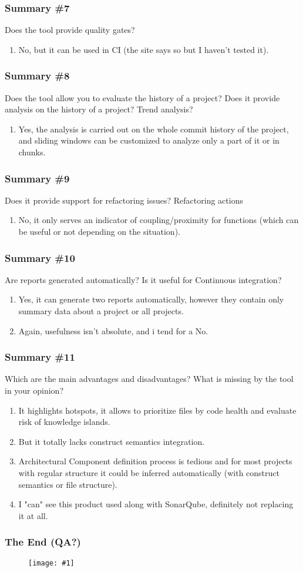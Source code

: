 \documentclass{beamer}
\newcommand{\putimage}[2] {
\begin{figure}[H]
  \centering
  \texttt{[image: \#1]}
\end{figure}
}
\begin{document}
\begin{frame}
  \frametitle{Summary \#7}
  Does the tool provide quality gates?
  \begin{enumerate}
    \item No, but it can be used in CI (the site says so but I haven't tested it).
  \end{enumerate}
\end{frame}

\begin{frame}
  \frametitle{Summary \#8}
  Does the tool allow you to evaluate the history of a project? Does it provide analysis on the history of a project? Trend analysis?
  \begin{enumerate}
    \item Yes, the analysis is carried out on the whole commit history of the project, and sliding windows can be customized to analyze only a part of it or in chunks.
  \end{enumerate}
\end{frame}

\begin{frame}
  \frametitle{Summary \#9}
  Does it provide support for refactoring issues? Refactoring actions
  \begin{enumerate}
    \item No, it only serves an indicator of coupling/proximity for functions (which can be useful or not depending on the situation).
  \end{enumerate}
\end{frame}

\begin{frame}
  \frametitle{Summary \#10}
  Are reports generated automatically? Is it useful for Continuous integration?
  \begin{enumerate}
    \item Yes, it can generate two reports automatically, however they contain only summary data about a project or all projects.
    \item Again, usefulness isn't absolute, and i tend for a No.
  \end{enumerate}
\end{frame}

\begin{frame}
  \frametitle{Summary \#11}
  Which are the main advantages and disadvantages?
  What is missing by the tool in your opinion?
  \begin{enumerate}
    \item It highlights hotspots, it allows to prioritize files by code health and evaluate risk of knowledge islands.
    \item But it totally lacks construct semantics integration.
    \item Architectural Component definition process is tedious and for most projects with regular structure it could be inferred automatically (with construct semantics or file structure).
    \item I "can" see this product used along with SonarQube, definitely not replacing it at all.
  \end{enumerate}
\end{frame}

\begin{frame}
  \centering
  \frametitle{The End (QA?)}
  \putimage{img/the-end.png}{0.50}
\end{frame}
\end{document}
